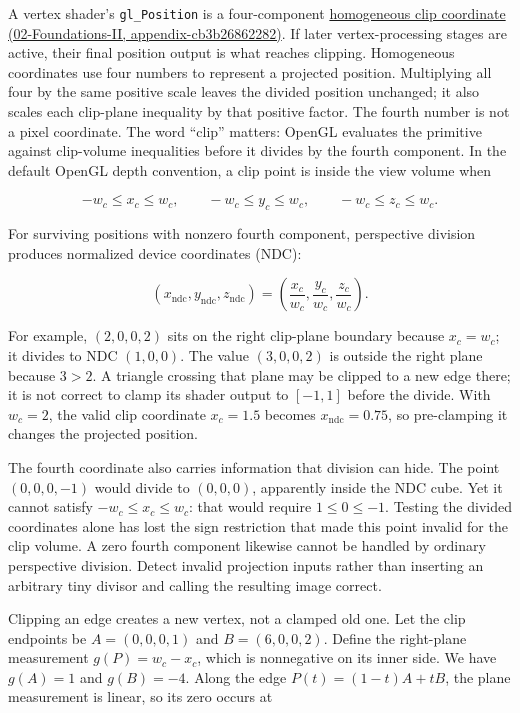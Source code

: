 A vertex shader's \texttt{gl\_Position} is a four-component \href{../02-Foundations-II/main.pdf\#nameddest=appendix-cb3b26862282}{homogeneous clip coordinate (02-Foundations-II, appendix-cb3b26862282)}. If later vertex-processing stages are active, their final position output is what reaches clipping. Homogeneous coordinates use four numbers to represent a projected position. Multiplying all four by the same positive scale leaves the divided position unchanged; it also scales each clip-plane inequality by that positive factor. The fourth number is not a pixel coordinate. The word ``clip'' matters: OpenGL evaluates the primitive against clip-volume inequalities before it divides by the fourth component. In the default OpenGL depth convention, a clip point is inside the view volume when

\[
-w_c\le x_c\le w_c,\qquad
-w_c\le y_c\le w_c,\qquad
-w_c\le z_c\le w_c.
\]

For surviving positions with nonzero fourth component, perspective division produces normalized device coordinates (NDC):

\[
(x_{\mathrm{ndc}},y_{\mathrm{ndc}},z_{\mathrm{ndc}})=
\left(\frac{x_c}{w_c},\frac{y_c}{w_c},\frac{z_c}{w_c}\right).
\]

For example, \((2,0,0,2)\) sits on the right clip-plane boundary because \(x_c=w_c\); it divides to NDC \((1,0,0)\). The value \((3,0,0,2)\) is outside the right plane because \(3>2\). A triangle crossing that plane may be clipped to a new edge there; it is not correct to clamp its shader output to \([-1,1]\) before the divide. With \(w_c=2\), the valid clip coordinate \(x_c=1.5\) becomes \(x_{\mathrm{ndc}}=0.75\), so pre-clamping it changes the projected position.

The fourth coordinate also carries information that division can hide. The point \((0,0,0,-1)\) would divide to \((0,0,0)\), apparently inside the NDC cube. Yet it cannot satisfy \(-w_c\leq x_c\leq w_c\): that would require \(1\leq0\leq-1\). Testing the divided coordinates alone has lost the sign restriction that made this point invalid for the clip volume. A zero fourth component likewise cannot be handled by ordinary perspective division. Detect invalid projection inputs rather than inserting an arbitrary tiny divisor and calling the resulting image correct.

Clipping an edge creates a new vertex, not a clamped old one. Let the clip endpoints be \(A=(0,0,0,1)\) and \(B=(6,0,0,2)\). Define the right-plane measurement \(g(P)=w_c-x_c\), which is nonnegative on its inner side. We have \(g(A)=1\) and \(g(B)=-4\). Along the edge \(P(t)=(1-t)A+tB\), the plane measurement is linear, so its zero occurs at

